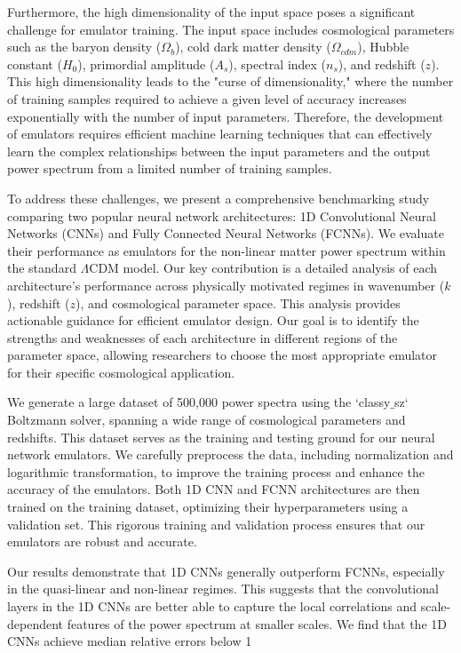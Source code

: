 \documentclass[twocolumn]{aastex631}
\begin{document}
\noindent Furthermore, the high dimensionality of the input space poses a significant challenge for emulator training. The input space includes cosmological parameters such as the baryon density (\(\Omega_b\)), cold dark matter density (\(\Omega_{cdm}\)), Hubble constant (\(H_0\)), primordial amplitude (\(A_s\)), spectral index (\(n_s\)), and redshift (\(z\)). This high dimensionality leads to the "curse of dimensionality," where the number of training samples required to achieve a given level of accuracy increases exponentially with the number of input parameters. Therefore, the development of emulators requires efficient machine learning techniques that can effectively learn the complex relationships between the input parameters and the output power spectrum from a limited number of training samples.

\noindent To address these challenges, we present a comprehensive benchmarking study comparing two popular neural network architectures: 1D Convolutional Neural Networks (CNNs) and Fully Connected Neural Networks (FCNNs). We evaluate their performance as emulators for the non-linear matter power spectrum within the standard \(\Lambda\)CDM model. Our key contribution is a detailed analysis of each architecture's performance across physically motivated regimes in wavenumber (\(k\)), redshift (\(z\)), and cosmological parameter space. This analysis provides actionable guidance for efficient emulator design. Our goal is to identify the strengths and weaknesses of each architecture in different regions of the parameter space, allowing researchers to choose the most appropriate emulator for their specific cosmological application.

\noindent We generate a large dataset of 500,000 power spectra using the `classy\ensuremath{\_}sz` Boltzmann solver, spanning a wide range of cosmological parameters and redshifts. This dataset serves as the training and testing ground for our neural network emulators. We carefully preprocess the data, including normalization and logarithmic transformation, to improve the training process and enhance the accuracy of the emulators. Both 1D CNN and FCNN architectures are then trained on the training dataset, optimizing their hyperparameters using a validation set. This rigorous training and validation process ensures that our emulators are robust and accurate.

\noindent Our results demonstrate that 1D CNNs generally outperform FCNNs, especially in the quasi-linear and non-linear regimes. This suggests that the convolutional layers in the 1D CNNs are better able to capture the local correlations and scale-dependent features of the power spectrum at smaller scales. We find that the 1D CNNs achieve median relative errors below 1%
\end{document}
